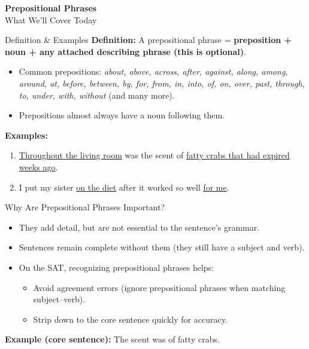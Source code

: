 \documentclass[aspectratio=169,11pt]{beamer}
\begin{document}
\begin{frame}
  \centering
  \Huge \textbf{Prepositional Phrases} \\[1.5em]
  \Large What We’ll Cover Today
\end{frame}

\begin{frame}{Definition \& Examples}
\small
\textbf{Definition:} A prepositional phrase = \textbf{preposition + noun + any attached describing phrase (this is optional)}.  
\begin{itemize}
  \item Common prepositions: \emph{about, above, across, after, against, along, among, around, at, before, between, by, for, from, in, into, of, on, over, past, through, to, under, with, without} (and many more).
  \item Prepositions almost always have a noun following them.
\end{itemize}

\textbf{Examples:}
\begin{enumerate}
  \item \underline{Throughout the living room} was the scent of \underline{fatty crabs that had expired weeks ago}.
  \item I put my sister \underline{on the diet} after it worked so well \underline{for me}.
\end{enumerate}
\end{frame}

\begin{frame}{Why Are Prepositional Phrases Important?}
\begin{itemize}
  \item They add detail, but are not essential to the sentence’s grammar.
  \item Sentences remain complete without them (they still have a subject and verb).
  \item On the SAT, recognizing prepositional phrases helps:
  \begin{itemize}
    \item Avoid agreement errors (ignore prepositional phrases when matching subject–verb).
    \item Strip down to the core sentence quickly for accuracy.
  \end{itemize}
\end{itemize}

\vspace{0.5em}
\textbf{Example (core sentence):}  
The scent was of fatty crabs.
\end{frame}
\end{document}
